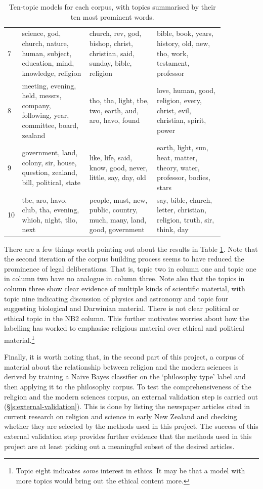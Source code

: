 \documentclass{article}
\begin{document}
\begin{table}[]
\begin{tabular}{p{0.01\linewidth}|p{0.28\linewidth}| p{0.28\linewidth}| p{0.28\linewidth}}
          7	& science, god, church, nature, human, subject, education, mind, knowledge, religion & church, rev, god, bishop, christ, christian, said, sunday, bible, religion & bible, book, years, history, old, new, tho, work, testament, professor \\
          8	& meeting, evening, held, messrs, company, following, year, committee, board, zealand & tho, tha, light, tbe, two, earth, aud, aro, havo, found & love, human, good, religion, every, christ, evil, christian, spirit, power \\
          9	& government, land, colony, sir, house, question, zealand, bill, political, state & like, life, said, know, good, never, little, say, day, old & earth, light, sun, heat, matter, theory, water, professor, bodies, stars \\
          10	& tbe, aro, havo, club, tha, evening, whioh, night, tlio, next &	people, must, new, public, country, much, many, land, good, government	& say, bible, church, letter, christian, religion, truth, sir, think, day \\
        \end{tabular}
        \caption{Ten-topic models for each corpus, with topics summarised by their ten most prominent words.}
        \label{t:ten-topic}
\end{table}

There are a few things worth pointing out about the results in Table \ref{t:ten-topic}. Note that the second iteration of the corpus building process seems to have reduced the prominence of legal deliberations. That is, topic two in column one and topic one in column two have no analogue in column three. Note also that the topics in column three show clear evidence of multiple kinds of scientific material, with topic nine indicating discussion of physics and astronomy and topic four suggesting biological and Darwinian material. There is not clear political or ethical topic in the NB2 column. This further motivates worries about how the labelling has worked to emphasise religious material over ethical and political material.\footnote{Topic eight indicates \emph{some} interest in ethics. It may be that a model with more topics would bring out the ethical content more.}

Finally, it is worth noting that, in the second part of this project, a corpus of material about the relationship between religion and the modern sciences is derived by training a Naive Bayes classifier on the `philosophy type' label and then applying it to the philosophy corpus. To test the comprehensiveness of the religion and the modern sciences corpus, an external validation step is carried out (\S \ref{s:external-validation}). This is done by listing the newspaper articles cited in current research on religion and science in early New Zealand and checking whether they are selected by the methods used in this project. The success of this external validation step provides further evidence that the methods used in this project are at least picking out a meaningful subset of the desired articles.
\end{document}
